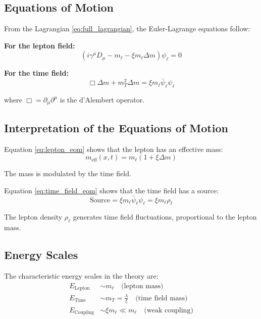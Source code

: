 	\subsection{Equations of Motion}
	
	From the Lagrangian \eqref{eq:full_lagrangian}, the Euler-Lagrange equations follow:
	
	\textbf{For the lepton field:}
	\begin{equation}
		(i\gamma^\mu D_\mu - m_\ell - \xi m_\ell \Delta m)\psi_\ell = 0
		\label{eq:lepton_eom}
	\end{equation}
	
	\textbf{For the time field:}
	\begin{equation}
		\Box \Delta m + m_T^2 \Delta m = \xi m_\ell \bar{\psi}_\ell \psi_\ell
		\label{eq:time_field_eom}
	\end{equation}
	
	where $\Box = \partial_\mu \partial^\mu$ is the d'Alembert operator.
	
	\subsection{Interpretation of the Equations of Motion}
	
	Equation \eqref{eq:lepton_eom} shows that the lepton has an effective mass:
	\begin{equation}
		m_{\text{eff}}(x,t) = m_\ell (1 + \xi \Delta m)
		\label{eq:effective_mass}
	\end{equation}
	
	The mass is modulated by the time field.
	
	Equation \eqref{eq:time_field_eom} shows that the time field has a source:
	\begin{equation}
		\text{Source} = \xi m_\ell \bar{\psi}_\ell \psi_\ell = \xi m_\ell \rho_\ell
		\label{eq:source_term}
	\end{equation}
	
	The lepton density $\rho_\ell$ generates time field fluctuations, proportional to the lepton mass.
	
	\subsection{Energy Scales}
	
	The characteristic energy scales in the theory are:
	\begin{align}
		E_{\text{Lepton}} &\sim m_\ell \quad \text{(lepton mass)} \label{eq:lepton_scale} \\
		E_{\text{Time}} &\sim m_T = \frac{\lambda}{\xi} \quad \text{(time field mass)} \label{eq:time_scale} \\
		E_{\text{Coupling}} &\sim \xi m_\ell \ll m_\ell \quad \text{(weak coupling)} \label{eq:coupling_scale}
	\end{align}
	
